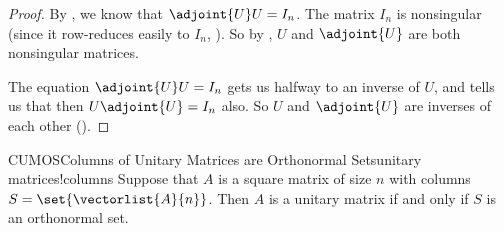 %
\begin{proof}
By , we know that $\adjoint{U}U=I_n$.  The matrix $I_n$ is nonsingular (since it row-reduces easily to $I_n$, ).  So by , $U$ and $\adjoint{U}$ are both nonsingular matrices.\par
%
The equation $\adjoint{U}U=I_n$ gets us halfway to an inverse of $U$, and  tells us that then $U\adjoint{U}=I_n$ also.  So $U$ and $\adjoint{U}$ are inverses of each other ().
%
\end{proof}
%
\begin{theorem}{CUMOS}{Columns of Unitary Matrices are Orthonormal Sets}{unitary matrices!columns}
Suppose that $A$ is a square matrix of size $n$ with columns $S=\set{\vectorlist{A}{n}}$.  Then $A$ is a unitary matrix if and only if $S$ is an orthonormal set.
\end{theorem}
%
